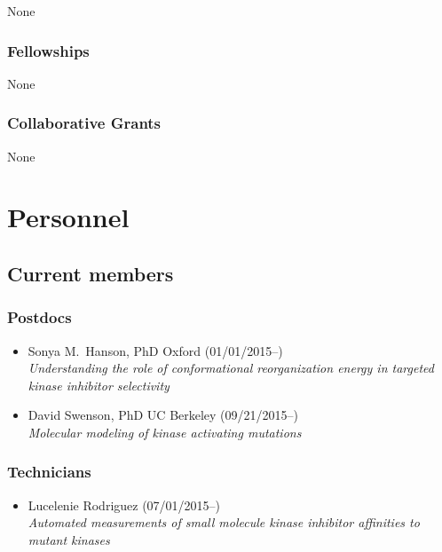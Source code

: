 \documentclass[10pt]{article}
\begin{document}
None

\subsubsection*{Fellowships}

None

\subsubsection*{Collaborative Grants}

None

\eject


\section*{Personnel}

\subsection*{Current members}

\subsubsection*{Postdocs}

\begin{itemize}
  \item Sonya M.~Hanson, PhD Oxford (01/01/2015--)\\
  \emph{Understanding the role of conformational reorganization energy in targeted kinase inhibitor selectivity}

  \item David Swenson, PhD UC Berkeley (09/21/2015--)\\
  \emph{Molecular modeling of kinase activating mutations}
\end{itemize}

\subsubsection*{Technicians}

\begin{itemize}
  \item Lucelenie Rodriguez (07/01/2015--)\\
  \emph{Automated measurements of small molecule kinase inhibitor affinities to mutant kinases}
\end{itemize}
\end{document}
